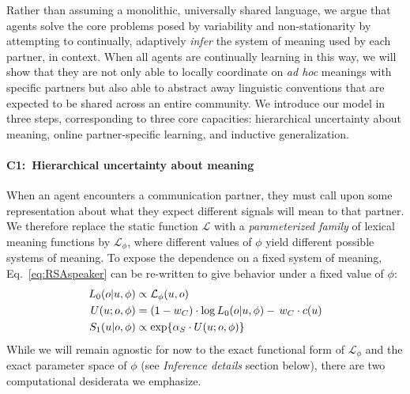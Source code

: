 Rather than assuming a monolithic, universally shared language, we argue that agents solve the core problems posed by variability and non-stationarity by attempting to continually, adaptively \emph{infer} the system of meaning used by each partner, in context.
When all agents are continually learning in this way, we will show that they are not only able to locally coordinate on \emph{ad hoc} meanings with specific partners but also able to abstract away linguistic conventions that are expected to be shared across an entire community.
We introduce our model in three steps, corresponding to three core capacities: hierarchical uncertainty about meaning, online partner-specific learning, and inductive generalization.

\paragraph{C1:~Hierarchical uncertainty about meaning} 

When an agent encounters a communication partner, they must call upon some representation about what they expect different signals will mean to that partner. 
We therefore replace the static function $\mathcal{L}$ with a \emph{parameterized family} of lexical meaning functions by $\mathcal{L}_{\phi}$, where different values of $\phi$ yield different possible systems of meaning. 
To expose the dependence on a fixed system of meaning, Eq.~\ref{eq:RSAspeaker} can be re-written to give behavior under a fixed value of $\phi$:
\begin{align}
L_0(o | u, \phi) &\propto  \mathcal{L}_\phi(u,o)\hfill\label{eq:RSA} \\
U(u; o, \phi) & = (1-w_C) \cdot \log L_0(o | u, \phi) -\, w_C \cdot c(u) \nonumber  \\
S_1(u | o,\phi) & \propto   \exp\{\alpha_S \cdot U(u; o, \phi)\} \nonumber 
\end{align}
While we will remain agnostic for now to the exact functional form of $\mathcal{L}_\phi$ and the exact parameter space of $\phi$ (see \emph{Inference details} section below), there are two computational desiderata we emphasize.


